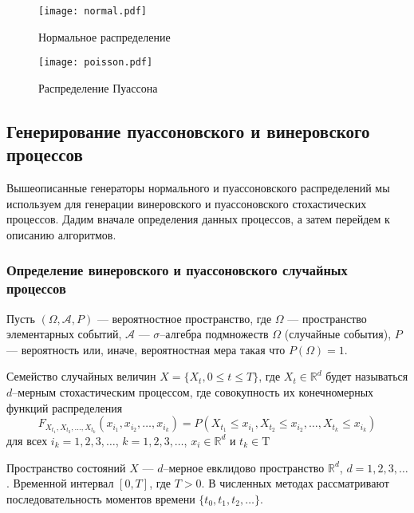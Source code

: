 \documentclass[%
floatfix,
showkeys,
nofootinbib, %
superscriptaddress, %
]{revtex4-1}
\begin{document}
\begin{figure}
  \centering
  \begin{minipage}[b]{0.48\linewidth}
    \texttt{[image: normal.pdf]}
    \caption{Нормальное распределение}
    \label{fig:normal}
  \end{minipage}
  \hfill
  \begin{minipage}[b]{0.48\linewidth}
    \texttt{[image: poisson.pdf]}
    \caption{Распределение Пуассона}
    \label{fig:poisson}
  \end{minipage}
\end{figure}

\subsection{Генерирование пуассоновского и винеровского процессов}

Вышеописанные генераторы нормального и пуассоновского распределений мы
используем для генерации винеровского и пуассоновского стохастических
процессов. Дадим вначале определения данных процессов, а затем
перейдем к описанию алгоритмов.

\subsubsection{Определение винеровского и пуассоновского случайных процессов}

Пусть $(\Omega, \mathscr{A}, P)$ --- вероятностное пространство, где
$\Omega$ --- пространство элементарных событий, $\mathscr{A}$ ---
$\sigma$--алгебра подмножеств $\Omega$ (случайные события), $P$ ---
вероятность или, иначе, вероятностная мера такая что $P(\Omega) = 1$.

\begin{thedefinition*}
        Семейство случайных величин $X = \{X_{t}, 0 \leqslant t \leqslant T\}$, где $X_{t} \in \mathbb{R}^{d}$ будет называться $d$--мерным стохастическим процессом, где совокупность их конечномерных функций распределения 
        \[
                F_{X_{t_{1}},X_{t_{2}},\ldots,X_{t_{k}}}(x_{i_1},x_{i_2},\ldots,x_{i_k}) = P(X_{t_{1}}\leqslant x_{i_1}, X_{t_{2}} \leqslant x_{i_2}, \ldots, X_{t_{k}} \leqslant x_{i_k})
        \]
        для всех $i_{k} = 1,2,3,\ldots$, $k = 1,2,3,\ldots$, $x_{i} \in \mathbb{R}^{d}$ и $t_{k} \in \mathrm{T}$
\end{thedefinition*}

Пространство состояний $X$ --- $d$--мерное евклидово пространство
$\mathbb{R}^{d}$, $d=1,2,3,\ldots$. Временной интервал $[0, T]$, где
$T>0$. В численных методах рассматривают последовательность моментов
времени $\{t_0,t_1,t_2,\ldots \}$.
\end{document}
